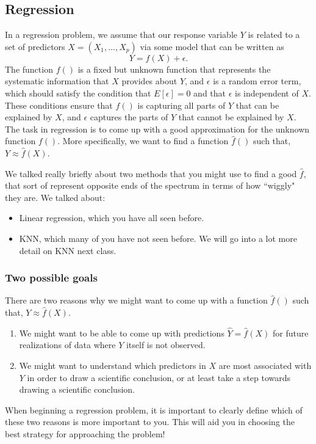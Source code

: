 \subsection{Regression}

In a regression problem, we assume that our response variable $Y$ is related to a set of predictors $X= (X_1,\ldots,X_p)$ via some model that can be written as
\begin{equation}
\label{eq_model}
Y = f(X)+\epsilon. 
\end{equation}
The function $f()$ is a fixed but unknown function that represents the systematic information that $X$ provides about $Y$, and $\epsilon$ is a random error term, which should satisfy the condition that $E[\epsilon] = 0$ and that $\epsilon$ is independent of $X$. These conditions ensure that $f()$ is capturing all parts of $Y$ that can be explained by $X$, and $\epsilon$ captures the parts of $Y$ that cannot be explained by $X$. The task in regression is to come up with a good approximation for the unknown function $f()$. More specifically, we want to find a function $\hat{f}()$ such that, $Y \approx \hat{f}(X)$. 

We talked really briefly about two methods that you might use to find a good $\hat{f}$, that sort of represent opposite ends of the spectrum in terms of how ``wiggly" they are. We talked about:
\begin{itemize}
\item Linear regression, which you have all seen before.
\item KNN, which many of you have not seen before. We will go into a lot more detail on KNN next class. 	
\end{itemize}

\subsubsection{Two possible goals}

There are two reasons why we might want to come up with a function $\hat{f}()$ such that, $Y \approx \hat{f}(X)$. 
\begin{enumerate}
\item We might want to be able to come up with predictions 	$\hat{Y} = \hat{f}(X)$ for future realizations of data where $Y$ itself is not observed.
\item We might want to understand which predictors in $X$ are most associated with $Y$ in order to draw a scientific conclusion, or at least take a step towards drawing a scientific conclusion. 
\end{enumerate}
When beginning a regression problem, it is important to clearly define which of these two reasons is more important to you. This will aid you in choosing the best strategy for approaching the problem! 


